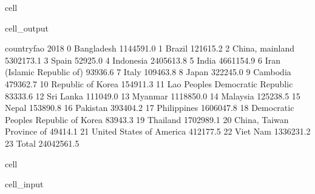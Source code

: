 \documentclass[letterpaper,10pt,english]{jupyterBook}
\begin{document}
\begin{sphinxuseclass}{cell}
\begin{sphinxVerbatimOutput}
\begin{sphinxuseclass}{cell_output}
\begin{sphinxVerbatim}[commandchars=\\\{\}]
                              country\PYGZus{}fao        2018  
0                              Bangladesh   1144591.0  
1                                  Brazil    121615.2  
2                         China, mainland   5302173.1  
3                                   Spain     52925.0  
4                               Indonesia   2405613.8  
5                                   India   4661154.9  
6              Iran (Islamic Republic of)     93936.6  
7                                   Italy    109463.8  
8                                   Japan    322245.0  
9                                Cambodia    479362.7  
10                      Republic of Korea    154911.3  
11       Lao People\PYGZsq{}s Democratic Republic     83333.6  
12                              Sri Lanka    111049.0  
13                                Myanmar   1118850.0  
14                               Malaysia    125238.5  
15                                  Nepal    153890.8  
16                               Pakistan    393404.2  
17                            Philippines   1606047.8  
18  Democratic People\PYGZsq{}s Republic of Korea     83943.3  
19                               Thailand   1702989.1  
20              China, Taiwan Province of     49414.1  
21               United States of America    412177.5  
22                               Viet Nam   1336231.2  
23                                  Total  24042561.5  
\end{sphinxVerbatim}

\end{sphinxuseclass}\end{sphinxVerbatimOutput}

\end{sphinxuseclass}
\begin{sphinxuseclass}{cell}\begin{sphinxVerbatimInput}

\begin{sphinxuseclass}{cell_input}
\begin{sphinxVerbatim}[commandchars=\\\{\}]
   
\end{sphinxVerbatim}

\end{sphinxuseclass}\end{sphinxVerbatimInput}

\end{sphinxuseclass}
\end{document}
